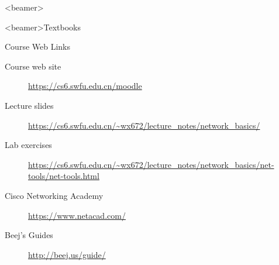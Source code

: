 \mode*
{}

\begin{frame}<beamer>
  \titlepage
\end{frame}

\begin{frame}<beamer>{Textbooks}
  \begin{refsection}
    \nocite{tanenbaum2011computer,kurose2013computer,fall2011tcp}
    \printbibliography[heading=none]
  \end{refsection}
\end{frame}

\begin{frame}{Course Web Links}
  \begin{description}
  \item[Course web site] \url{https://cs6.swfu.edu.cn/moodle}
  \item[Lecture slides] \url{https://cs6.swfu.edu.cn/~wx672/lecture_notes/network_basics/}
  \item[Lab exercises] \url{https://cs6.swfu.edu.cn/~wx672/lecture_notes/network_basics/net-tools/net-tools.html}
  \item[Cisco Networking Academy] \url{https://www.netacad.com/}
  \item[Beej's Guides] \url{http://beej.us/guide/}
  \end{description}
\end{frame}

